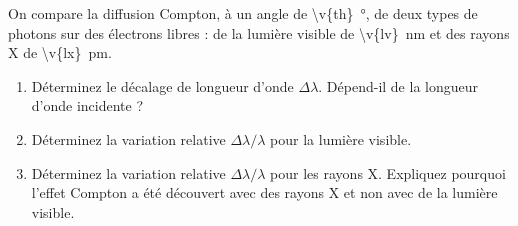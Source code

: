 On compare la diffusion Compton, à un angle de \qty{\v{th}}{\degree}, de deux types de photons sur des électrons libres : de la lumière visible de \qty{\v{lv}}{nm} et des rayons X de \qty{\v{lx}}{pm}.

\begin{enumerate}[label=\alph*)]
    \item Déterminez le décalage de longueur d'onde $\Delta\lambda$. Dépend-il de la longueur d'onde incidente ?
    \item Déterminez la variation relative $\Delta\lambda/\lambda$ pour la lumière visible.
    \item Déterminez la variation relative $\Delta\lambda/\lambda$ pour les rayons X. Expliquez pourquoi l'effet Compton a été découvert avec des rayons X et non avec de la lumière visible.
\end{enumerate}
